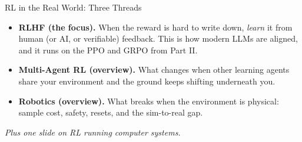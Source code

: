 \begin{frame}{RL in the Real World: Three Threads}
\begin{itemize}\itemsep0.6em
    \item \textbf{RLHF (the focus).} When the reward is hard to write down,
          \emph{learn} it from human (or AI, or verifiable) feedback. This is how
          modern LLMs are aligned, and it runs on the PPO and GRPO from Part II.
    \item \textbf{Multi-Agent RL (overview).} What changes when other learning
          agents share your environment and the ground keeps shifting underneath
          you.
    \item \textbf{Robotics (overview).} What breaks when the environment is
          physical: sample cost, safety, resets, and the sim-to-real gap.
\end{itemize}
\vfill
\begin{center}
\itshape Plus one slide on RL running computer systems.
\end{center}
\end{frame}
